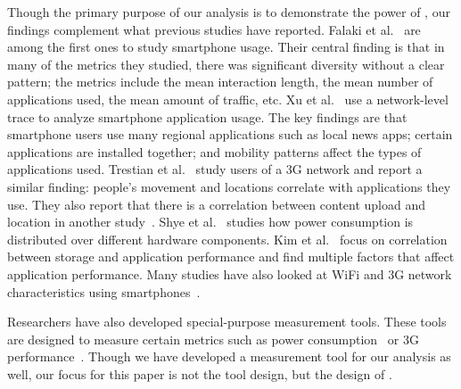 Though the primary purpose of our analysis is to demonstrate the power of
\PhoneLab{}, our findings complement what previous studies have reported. Falaki
et al.~\cite{falaki:mobisys:2010} are among the first ones to study smartphone
usage. Their central finding is that in many of the metrics they studied, there
was significant diversity without a clear pattern; the metrics include the mean
interaction length, the mean number of applications used, the mean amount of
traffic, etc. Xu et al.~\cite{xu:imc:2011} use a network-level trace to analyze
smartphone application usage. The key findings are that smartphone users use
many regional applications such as local news apps; certain applications are
installed together; and mobility patterns affect the types of applications
used. Trestian et al.~\cite{trestian:imc:2009} study users of a 3G network and
report a similar finding: people's movement and locations correlate with
applications they use. They also report that there is a correlation between
content upload and location in another study~\cite{trestian:ton:2012}. Shye et
al.~\cite{shye:micro:2009} studies how power consumption is distributed over
different hardware components. Kim et al.~\cite{kim:fast:2012} focus on
correlation between storage and application performance and find multiple
factors that affect application performance. Many studies have also looked at
WiFi and 3G network characteristics using
smartphones~\cite{keralapura:mobicom:2010, maier:pam:2010, gember:pam:2011}.

Researchers have also developed special-purpose measurement tools. These tools
are designed to measure certain metrics such as power
consumption~\cite{zhang:codes:2010, pathak:eurosys:2012} or 3G
performance~\cite{huang:mobisys:2010}. Though we have developed a measurement
tool for our analysis as well, our focus for this paper is not the tool design,
but the design of \PhoneLab{}.
